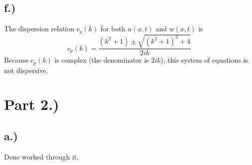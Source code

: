\documentclass{article}
\begin{document}
\subsection*{f.)}
The dispersion relation $c_p(k)$ for both $u(x,t)$ and $w(x, t)$ is 
\begin{equation}
c_p(k) = \frac{(k^2 + 1) \pm \sqrt{(k^2 + 1)^2 +4}}{2ik}
\end{equation}
Because $c_p(k)$ is complex (the denominator is $2ik$), this system of equations is not dispersive. 
\section*{Part 2.)}
\subsection*{a.)}
Done worked through it.
\end{document}

